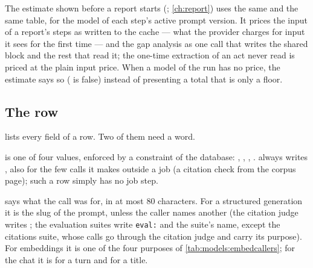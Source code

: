 The estimate shown before a report starts (; \cref{ch:report}) uses
the same  and the same table, for the model of each step's active prompt
version. It prices the input of a report's steps as written to the cache --- what the provider
charges for input it sees for the first time --- and the gap analysis as one call that writes
the shared block and the rest that read it; the one-time extraction of an act never read is
priced at the plain input price. When a model of the run has no price, the estimate
says so ( is false) instead of presenting a total that is only a floor.

\subsection{The row}

 lists every field of a row. Two of them need a word.

 is one of four values, enforced by a constraint of the database: ,
, , .  always writes
, also for the few calls it makes outside a job (a citation check from the
corpus page); such a row simply has no job step.

 says what the call was for, in at most 80 characters. For a structured
generation it is the slug of the prompt, unless the caller names another (the citation judge
writes ; the evaluation suites write \texttt{eval:} and the suite's name,
except the citations suite, whose calls go through the citation judge and carry its purpose).
For embeddings it is one of the four purposes of \cref{tab:models:embedcallers}; for the chat
it is  for a turn and  for a title.

